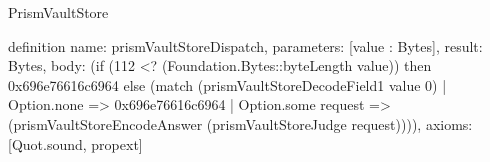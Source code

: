 \begin{lexlean}{PrismVaultStore}
\begin{semanticmodule}
definition{
  name: prismVaultStoreDispatch,
  parameters: [value : Bytes],
  result: Bytes,
  body: (if (112 <? (Foundation.Bytes::byteLength value)) then 0x696e76616c6964 else (match (prismVaultStoreDecodeField1 value 0)
    | Option.none => 0x696e76616c6964
    | Option.some request => (prismVaultStoreEncodeAnswer (prismVaultStoreJudge request)))),
  axioms: [Quot.sound, propext]
}
\end{semanticmodule}
\end{lexlean}
